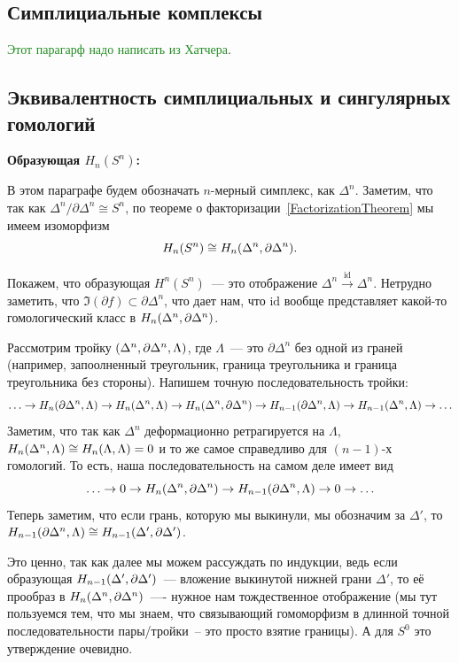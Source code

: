     \subsection{Симплициальные комплексы}

    \textcolor{ForestGreen}{Этот парагарф надо написать из Хатчера}.

    \subsection{Эквивалентность симплициальных и сингулярных гомологий}

    \noindent\bf{Образующая $H_{n}(S^n)$:}

    В этом параграфе будем обозначать $n$-мерный симплекс, как $\Delta^n$. Заметим, что так как $\Delta^n/\partial \Delta^n \cong S^n$, по теореме о факторизации~\ref{FactorizationTheorem}
    мы имеем изоморфизм
    \[ H_{n}\lr*{S^n}\cong H_n\lr*{\Delta^n, \partial \Delta^n}. \]

    Покажем, что образующая $H^{n}(S^n)$~--- это отображение $\Delta^n \xrightarrow{\mathrm{id}} \Delta^n$.
    Нетрудно заметить, что $\Im(\partial f) \subset \partial \Delta^n$, что дает нам, что $\mathrm{id}$ вообще
    представляет какой-то гомологический класс в $H_{n}\lr*{\Delta^n, \partial \Delta^n}$.

    Рассмотрим тройку $\lr*{\Delta^n, \partial \Delta^n, \Lambda}$, где $\Lambda$~--- это
    $\partial \Delta^n$ без одной из граней (например, запоолненный треугольник, граница треугольника и граница треугольника без стороны).
    Напишем точную последовательность тройки:
    \[ \ldots \to H_{n}\lr*{\partial \Delta^n, \Lambda} \to H_{n}\lr*{\Delta^n, \Lambda} \to H_{n}\lr*{\Delta^n, \partial \Delta^n} \to H_{n - 1}\lr*{\partial \Delta^n, \Lambda} \to H_{n - 1}\lr*{\Delta^n, \Lambda} \to \ldots  \]
    Заметим, что так как $\Delta^n$ деформационно ретрагируется на $\Lambda$, $H_{n}\lr*{\Delta^n, \Lambda} \cong H_{n}\lr*{\Lambda, \Lambda} = 0$ и то
    же самое справедливо для $(n - 1)$-х гомологий. То есть, наша последовательность на самом деле имеет вид
    \[ \ldots \to  0 \to H_{n}\lr*{\Delta^n, \partial \Delta^n} \to H_{n - 1}\lr*{\partial \Delta^n, \Lambda} \to 0 \to \ldots  \]
    Теперь заметим, что если грань, которую мы выкинули, мы обозначим за $\Delta'$, то $H_{n - 1}\lr*{\partial \Delta^n, \Lambda} \cong H_{n - 1}\lr*{\Delta', \partial \Delta'}$.

    Это ценно, так как далее мы можем рассуждать по индукции, ведь если образующая $H_{n - 1}\lr*{\Delta', \partial \Delta'}$~--- вложение выкинутой нижней грани $\Delta'$, то
    её прообраз в $H_{n}\lr*{\Delta^n, \partial \Delta^n}$~---- нужное нам тождественное отображение (мы тут пользуемся тем, что
    мы знаем, что связывающий гомоморфизм в длинной точной последовательности пары/тройки~-- это просто взятие границы). А для $S^0$ это утверждение очевидно.

